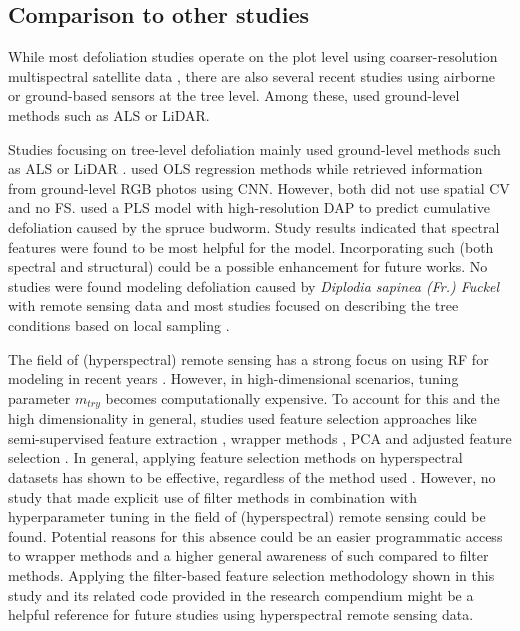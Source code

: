 \documentclass[remotesensing,article,submit,moreauthors,pdftex]{Definitions/mdpi}
\begin{document}
\subsection{Comparison to other studies}

While most defoliation studies operate on the plot level using coarser-resolution multispectral satellite data \cite{townsend2012, debeurs2008, rengarajan2016}, there are also several recent studies using airborne or ground-based sensors at the tree level.
Among these, \cite{meng2018, kalin2019} used ground-level methods such as \ac{ALS} or \ac{LiDAR}.

Studies focusing on tree-level defoliation mainly used ground-level methods such as \ac{ALS} or \ac{LiDAR} \cite{meng2018, kalin2019}.
\cite{meng2018} used \ac{OLS} regression methods while \cite{kalin2019} retrieved information from ground-level RGB photos using \ac{CNN}.
However, both did not use spatial \ac{CV} and \cite{kalin2019} no \ac{FS}.
\cite{goodbody2018} used a \ac{PLS} model with high-resolution \ac{DAP} to predict cumulative defoliation caused by the spruce budworm.
Study results indicated that spectral features were found to be most helpful for the model.
Incorporating such (both spectral and structural) could be a possible enhancement for future works.
No studies were found modeling defoliation caused by \textit{Diplodia sapinea (Fr.) Fuckel} with remote sensing data and most studies focused on describing the tree conditions based on local sampling \cite{hlebarska2018, kaya2019}.

The field of (hyperspectral) remote sensing has a strong focus on using RF for modeling in recent years \cite{belgiu2016}.
However, in high-dimensional scenarios, tuning parameter \texttt{\(m_{try}\)} becomes computationally expensive.
To account for this and the high dimensionality in general, studies used feature selection approaches like semi-supervised feature extraction \cite{xia2015}, wrapper methods \cite{fassnacht2014a, feng2016, georganos2018}, PCA and adjusted feature selection \cite{rochac2016}.
In general, applying feature selection methods on hyperspectral datasets has shown to be effective, regardless of the method used \cite{pal2010, keller2016}.
However, no study that made explicit use of filter methods in combination with hyperparameter tuning in the field of (hyperspectral) remote sensing could be found.
Potential reasons for this absence could be an easier programmatic access to wrapper methods and a higher general awareness of such compared to filter methods.
Applying the filter-based feature selection methodology shown in this study and its related code provided in the research compendium might be a helpful reference for future studies using hyperspectral remote sensing data.
\end{document}
